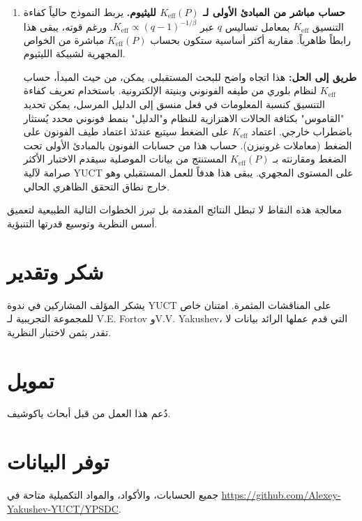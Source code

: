 \documentclass[12pt,a4paper]{article}
\newcommand{\Ke}{K_{\mathrm{eff}}}
\theoremstyle{remark}
\begin{document}
\begin{enumerate}
		\item \textbf{حساب مباشر من المبادئ الأولى لـ \(\Ke(P)\) لليثيوم.} يربط النموذج حالياً كفاءة التنسيق \(\Ke\) بمعامل تساليس \(q\) عبر \(\Ke \propto (q-1)^{-1/\beta}\). ورغم قوته، يبقى هذا رابطاً ظاهرياً. مقاربة أكثر أساسية ستكون بحساب \(\Ke(P)\) مباشرة من الخواص المجهرية لشبيكة الليثيوم.
		
		\textbf{طريق إلى الحل:} هذا اتجاه واضح للبحث المستقبلي. يمكن، من حيث المبدأ، حساب \(\Ke\) لنظام بلوري من طيفه الفونوني وبنيتة الإلكترونية. باستخدام تعريف كفاءة التنسيق كنسبة المعلومات في فعل منسق إلى الدليل المرسل، يمكن تحديد "القاموس" بكثافة الحالات الاهتزازية للنظام و"الدليل" بنمط فونوني محدد يُستثار باضطراب خارجي. اعتماد \(\Ke\) على الضغط سيتبع عندئذ اعتماد طيف الفونون على الضغط (معاملات غرونيزن). حساب هذا من حسابات الفونون بالمبادئ الأولى تحت الضغط ومقارنته بـ \(\Ke(P)\) المستنتج من بيانات الموصلية سيقدم الاختبار الأكثر صرامة لآلية YUCT على المستوى المجهري. يبقى هذا هدفاً للعمل المستقبلي وهو خارج نطاق التحقق الظاهري الحالي.
	\end{enumerate}
	معالجة هذه النقاط لا تبطل النتائج المقدمة بل تبرز الخطوات التالية الطبيعية لتعميق أسس النظرية وتوسيع قدرتها التنبؤية.
	
	\section*{شكر وتقدير}
	
	يشكر المؤلف المشاركين في ندوة YUCT على المناقشات المثمرة. امتنان خاص للمجموعة التجريبية لـ V.E. Fortov وV.V. Yakushev، التي قدم عملها الرائد بيانات لا تقدر بثمن لاختبار النظرية.
	
	\section*{تمويل}
	
	دُعم هذا العمل من قبل أبحاث ياكوشيف.
	
	\section*{توفر البيانات}
	
	جميع الحسابات، والأكواد، والمواد التكميلية متاحة في \url{https://github.com/Alexey-Yakushev-YUCT/YPSDC}.
	
\end{document}
